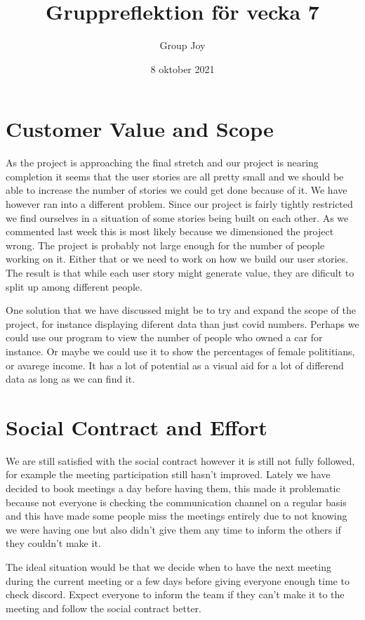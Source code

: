 \documentclass{scrartcl}
\begin{document}
\title{Gruppreflektion för vecka 7}
\author{Group Joy}
\date{8 oktober 2021}
\maketitle

\section{Customer Value and Scope}
As the project is approaching the final stretch and our project is nearing completion it seems that the user stories are all pretty small and we should be able to increase the number of stories we could get done because of it. We have however ran into a different problem. Since our project is fairly tightly restricted we find ourselves in a situation of some stories being built on each other. As we commented last week this is most likely because we dimensioned the project wrong. The project is probably not large enough for the number of people working on it. Either that or we need to work on how we build our user stories. The result is that while each user story might generate value, they are dificult to split up among different people. 

One solution that we have discussed might be to try and expand the scope of the project, for instance displaying diferent data than just covid numbers. Perhaps we could use our program to view the number of people who owned a car for instance. Or maybe we could use it to show the percentages of female polititians, or avarege income. It has a lot of potential as a visual aid for a lot of differend data as long as we can find it. 


\section{Social Contract and Effort}


We are still satisfied with the social contract however it is still not fully followed, for example the meeting participation still hasn't improved. Lately we have decided to book meetings a day before having them, this made it problematic because not everyone is checking the communication channel on a regular basis and this have made some people miss the meetings entirely due to not knowing we were having one but also didn't give them any time to inform the others if they couldn't make it.

The ideal situation would be that we decide when to have the next meeting during the current meeting or a few days before giving everyone enough time to check discord. Expect everyone to inform the team if they can't make it to the meeting and follow the social contract better.
\end{document}
